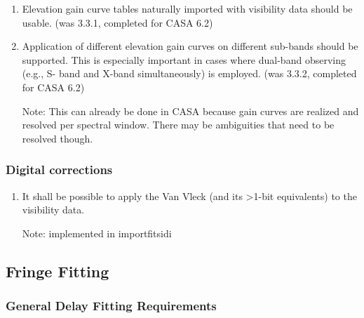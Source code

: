 \documentclass[11pt,a4paper]{article}
\begin{document}
\begin{enumerate}[subsubseclist]

\item Elevation gain curve tables naturally imported with visibility
  data should be usable.  (was 3.3.1, completed for CASA 6.2)

\item Application of different elevation gain curves on different
  sub-bands should be supported.  This is especially important in
  cases where dual-band observing (e.g., S- band and X-band
  simultaneously) is employed.  (was 3.3.2, completed for CASA 6.2)

  Note: This can already be done in CASA because gain curves are
  realized and resolved per spectral window.  There may be ambiguities
  that need to be resolved though.

\end{enumerate}


\subsubsection{Digital corrections}

\begin{enumerate}[subsubseclist]

\item It shall be possible to apply the Van Vleck (and its >1-bit
  equivalents) to the visibility data.

  Note: implemented in importfitsidi

\end{enumerate}


\subsection{Fringe Fitting}

\subsubsection{General Delay Fitting Requirements}
\end{document}
